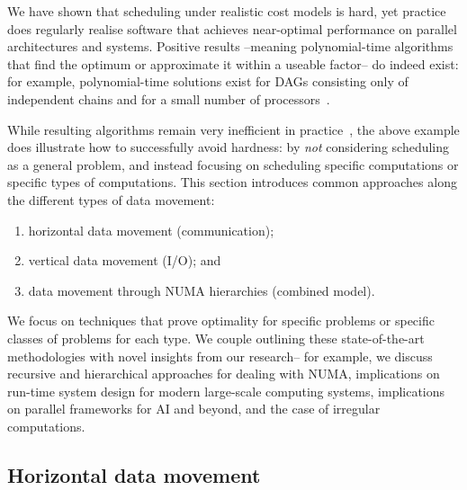 \documentclass[oneside,reqno, a4paper]{amsart}
\numberwithin{equation}{section}
\begin{document}
We have shown that scheduling under realistic cost models is hard,
yet practice does regularly realise software that achieves near-optimal performance on parallel architectures and systems.
Positive results --meaning polynomial-time algorithms that find the optimum or approximate it within a useable factor--
do indeed exist:
for example,
polynomial-time solutions exist for DAGs consisting only of independent chains and for a small number of processors~\cite{BSP_DAG_opdas,MPP_opdas,partial_opdas,multiBSP_opdas}.

While resulting algorithms remain very inefficient in practice~\cite{BSP_DAG_opdas},
the above example does illustrate how to successfully avoid hardness:
by \emph{not} considering scheduling as a general problem,
and instead focusing on scheduling specific computations or specific types of computations.
This section introduces common approaches along the different types of data movement:
\begin{enumerate}
	\item horizontal data movement (communication);
	\item vertical data movement (I/O); and
	\item data movement through NUMA hierarchies (combined model).
\end{enumerate}
We focus on techniques %
that prove optimality for specific problems or specific classes of problems for each type.
We couple outlining these state-of-the-art methodologies with novel insights from our research--
for example,
we discuss recursive and hierarchical approaches for dealing with NUMA,
implications on run-time system design for modern large-scale computing systems,
implications on parallel frameworks for AI and beyond, and
the case of irregular computations.

\subsection{Horizontal data movement}
\label{sec:avoiding-communication}
\end{document}
